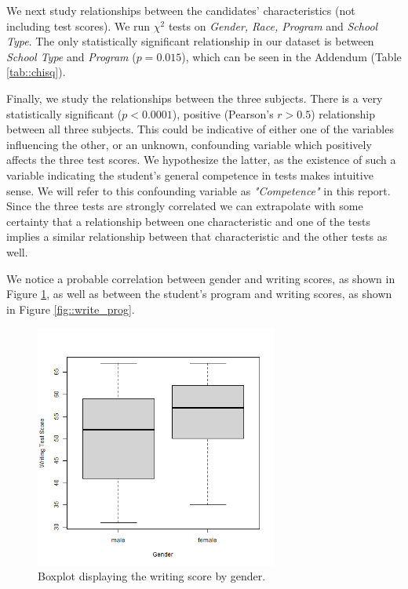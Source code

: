 \documentclass[10pt, a4paper]{article}
\begin{document}
	We next study relationships between the candidates' characteristics (not including test scores). We run $\chi^2$ tests on \textit{Gender, Race, Program} and \textit{School Type}. The only statistically significant relationship in our dataset is between \textit{School Type} and \textit{Program} ($p = 0.015$), which can be seen in the Addendum (Table \ref{tab::chisq}).
	
	Finally, we study the relationships between the three subjects. There is a very statistically significant ($p < 0.0001$), positive (Pearson's $r > 0.5$) relationship between all three subjects. This could be indicative of either one of the variables influencing the other, or an unknown, confounding variable which positively affects the three test scores. We hypothesize the latter, as the existence of such a variable indicating the student's general competence in tests makes intuitive sense. We will refer to this confounding variable as \textit{"Competence"} in this report. Since the three tests are strongly correlated we can extrapolate with some certainty that a relationship between one characteristic and one of the tests implies a similar relationship between that characteristic and the other tests as well.
	
	We notice a probable correlation between gender and writing scores, as shown in Figure \ref{fig::write_gender}, as well as between the student's program and writing scores, as shown in Figure \ref{fig::write_prog}.
	
	\begin{figure}
		\includegraphics[width=8cm]{write_genre_boxplot.png}
		\centering
		\caption{Boxplot displaying the writing score by gender.}
		\label{fig::write_gender}
	\end{figure}
	
\end{document}
